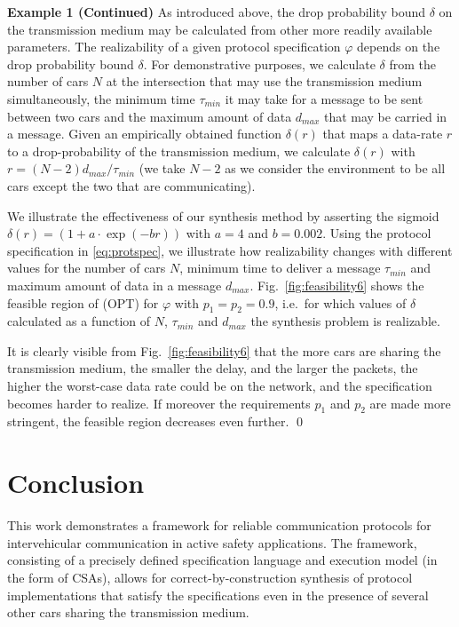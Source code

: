 \documentclass{sig-alternate}
\newenvironment{excont}[1]{\textbf{Example 1 (#1)}}{\qed}
\renewcommand{\v}{\varphi}
\renewcommand{\d}{\delta}
\newcommand{\fig}[1]{Fig.\ \ref{fig:#1}}
\begin{document}
\begin{excont}{Continued}
As introduced above, the drop probability bound $\d$ on the transmission medium may be calculated from other more readily available parameters. The realizability of a given protocol specification $\v$ depends on the drop probability bound $\d$. For demonstrative purposes, we calculate $\d$ from the number of cars $N$ at the intersection that may use the transmission medium simultaneously, the minimum time $\tau_{min}$ it may take for a message to be sent between two cars and the maximum amount of data $d_{max}$ that may be carried in a message. Given an empirically obtained function $\d(r)$ that maps a data-rate $r$ to a drop-probability of the transmission medium, we calculate $\d(r)$ with $r = (N-2)d_{max}/\tau_{min}$ (we take $N-2$ as we consider the environment to be all cars except the two that are communicating).

We illustrate the effectiveness of our synthesis method by asserting the sigmoid $\d(r) = (1 + a\cdot\exp(-br))$ with $a = 4$ and $b = 0.002$. Using the protocol specification in \eqref{eq:protspec}, we illustrate how realizability changes with different values for the number of cars $N$, minimum time to deliver a message $\tau_{min}$ and maximum amount of data in a message $d_{max}$. \fig{feasibility6} shows the feasible region of (OPT) for $\v$ with $p_1 = p_2 = 0.9$, i.e.\ for which values of $\d$ calculated as a function of $N$, $\tau_{min}$ and $d_{max}$ the synthesis problem is realizable.

It is clearly visible from \fig{feasibility6} that the more cars are sharing the transmission medium, the smaller the delay, and the larger the packets, the higher the worst-case data rate could be on the network, and the specification becomes harder to realize. If moreover the requirements $p_1$ and $p_2$ are made more stringent, the feasible region decreases even further.
\end{excont}



\vspace{-.06in}


\section{Conclusion} \label{sec:conclusion}


This work demonstrates a framework for reliable communication protocols for intervehicular communication in active safety applications. The framework, consisting of a precisely defined specification language and execution model (in the form of CSAs), allows for correct-by-construction synthesis of protocol implementations that satisfy the specifications even in the presence of several other cars sharing the transmission medium.
\end{document}
